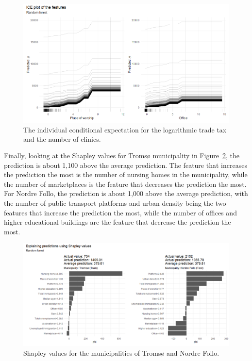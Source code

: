 \begin{figure}[H]
  \centering
  \includegraphics[width = \textwidth]{ice_rf_norway_1.png}
  \caption{The individual conditional expectation for the logarithmic trade tax and the number of clinics.}
  \label{ice_rf_norway_1}
\end{figure}
Finally, looking at the Shapley values for Tromsø municipality in Figure~\ref{shapley_rf_norway}, the prediction is about 1,100 above the average prediction. The feature that increases the prediction the most is the number of nursing homes in the municipality, while the number of marketplaces is the feature that decreases the prediction the most.
For Nordre Follo, the prediction is about 1,000 above the average prediction, with the number of public transport platforms and urban density being the two features that increase the prediction the most, while the number of offices and higher educational buildings are the feature that decrease the prediction the most.
\begin{figure}[H]
  \centering
  \includegraphics[width = \textwidth]{shapley_rf_norway.png}
  \caption{Shapley values for the municipalities of Tromsø and Nordre Follo.}
  \label{shapley_rf_norway}
\end{figure}
\clearpage
